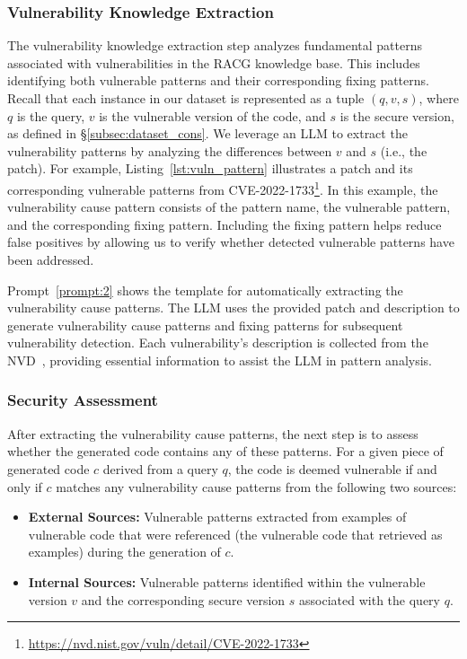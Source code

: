 \subsubsection{Vulnerability Knowledge Extraction}
The vulnerability knowledge extraction step analyzes fundamental patterns associated with vulnerabilities in the RACG knowledge base. This includes identifying both vulnerable patterns and their corresponding fixing patterns. Recall that each instance in our dataset is represented as a tuple $(q, v, s)$, where $q$ is the query, $v$ is the vulnerable version of the code, and $s$ is the secure version, as defined in \S\ref{subsec:dataset_cons}. We leverage an LLM to extract the vulnerability patterns by analyzing the differences between $v$ and $s$ (i.e., the patch).
For example, Listing~\ref{lst:vuln_pattern} illustrates a patch and its corresponding vulnerable patterns from CVE-2022-1733\footnote{\url{https://nvd.nist.gov/vuln/detail/CVE-2022-1733}}. In this example, the vulnerability cause pattern consists of the pattern name, the vulnerable pattern, and the corresponding fixing pattern. Including the fixing pattern helps reduce false positives by allowing us to verify whether detected vulnerable patterns have been addressed. 

Prompt~\ref{prompt:2} shows the template for automatically extracting the vulnerability cause patterns. The LLM uses the provided patch and description to generate vulnerability cause patterns and fixing patterns for subsequent vulnerability detection. Each vulnerability's description is collected from the NVD~\cite{nvd}, providing essential information to assist the LLM in pattern analysis.

\subsubsection{Security Assessment}
After extracting the vulnerability cause patterns, the next step is to assess whether the generated code contains any of these patterns. For a given piece of generated code $c$ derived from a query $q$, the code is deemed vulnerable if and only if $c$ matches any vulnerability cause patterns from the following two sources:
\begin{itemize}[leftmargin=*]
    \item \textbf{External Sources:} Vulnerable patterns extracted from examples of vulnerable code that were referenced (\ie the vulnerable code that retrieved as examples) during the generation of $c$.
    \item \textbf{Internal Sources:} Vulnerable patterns identified within the vulnerable version $v$ and the corresponding secure version $s$ associated with the query $q$.
\end{itemize}

